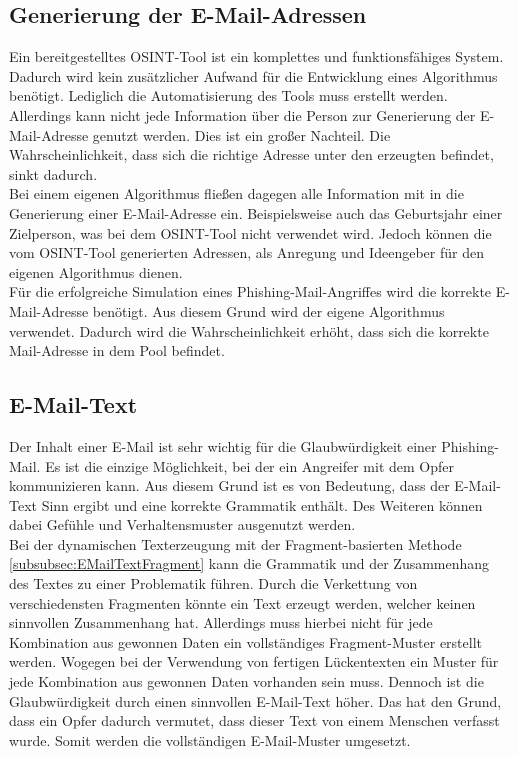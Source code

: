 	\subsection{Generierung der E-Mail-Adressen}
	Ein bereitgestelltes OSINT-Tool ist ein komplettes und funktionsfähiges System. Dadurch wird kein zusätzlicher Aufwand für die Entwicklung eines Algorithmus benötigt. Lediglich die Automatisierung des Tools muss erstellt werden. Allerdings kann nicht jede Information über die Person zur Generierung der E-Mail-Adresse genutzt werden. Dies ist ein großer Nachteil. Die Wahrscheinlichkeit, dass sich die richtige Adresse unter den erzeugten befindet, sinkt dadurch.\\
	Bei einem eigenen Algorithmus fließen dagegen alle Information mit in die Generierung einer E-Mail-Adresse ein. Beispielsweise auch das Geburtsjahr einer Zielperson, was bei dem OSINT-Tool \cite{EmailAssumptions} nicht verwendet wird. Jedoch können die vom OSINT-Tool generierten Adressen, als Anregung und Ideengeber für den eigenen Algorithmus dienen.\\
	Für die erfolgreiche Simulation eines Phishing-Mail-Angriffes wird die korrekte E-Mail-Adresse benötigt. Aus diesem Grund wird der eigene Algorithmus verwendet. Dadurch wird die Wahrscheinlichkeit erhöht, dass sich die korrekte Mail-Adresse in dem Pool befindet.
	
	\subsection{E-Mail-Text}
	Der Inhalt einer E-Mail ist sehr wichtig für die Glaubwürdigkeit einer Phishing-Mail. Es ist die einzige Möglichkeit, bei der ein Angreifer mit dem Opfer kommunizieren kann. Aus diesem Grund ist es von Bedeutung, dass der E-Mail-Text Sinn ergibt und eine korrekte Grammatik enthält. Des Weiteren können dabei Gefühle und Verhaltensmuster ausgenutzt werden.\\
	Bei der dynamischen Texterzeugung mit der Fragment-basierten Methode \ref{subsubsec:EMailTextFragment} kann die Grammatik und der Zusammenhang des Textes zu einer Problematik führen. Durch die Verkettung von verschiedensten Fragmenten könnte ein Text erzeugt werden, welcher keinen sinnvollen Zusammenhang hat. Allerdings muss hierbei nicht für jede Kombination aus gewonnen Daten ein vollständiges Fragment-Muster erstellt werden. Wogegen bei der Verwendung von fertigen Lückentexten ein Muster für jede Kombination aus gewonnen Daten vorhanden sein muss. Dennoch ist die Glaubwürdigkeit durch einen sinnvollen E-Mail-Text höher. Das hat den Grund, dass ein Opfer dadurch vermutet, dass dieser Text von einem Menschen verfasst wurde. Somit werden die vollständigen E-Mail-Muster umgesetzt.


	
